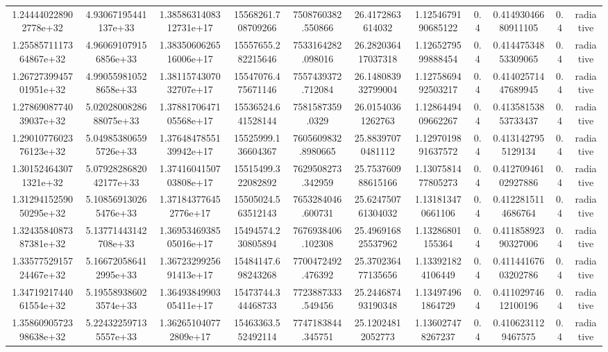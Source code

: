 \begin{table}
\begin{tabular}{ccccccccccc}
1.244440228902778e+32 & 4.93067195441137e+33 & 1.3858631408312731e+17 & 15568261.708709266 & 7508760382.550866 & 26.4172863614032 & 1.1254679190685122 & 0.4 & 0.41493046680911105 & 0.4 & radiative \\
1.2558571117364867e+32 & 4.960691079156856e+33 & 1.3835060626516006e+17 & 15557655.282215646 & 7533164282.098016 & 26.282036417037318 & 1.1265279599888454 & 0.4 & 0.41447534853309065 & 0.4 & radiative \\
1.2672739945701951e+32 & 4.990559810528658e+33 & 1.3811574307032707e+17 & 15547076.475671146 & 7557439372.712084 & 26.148083932799004 & 1.1275869492503217 & 0.4 & 0.41402571447689945 & 0.4 & radiative \\
1.2786908774039037e+32 & 5.0202800828688075e+33 & 1.3788170647105568e+17 & 15536524.641528144 & 7581587359.0329 & 26.01540361262763 & 1.1286449409662267 & 0.4 & 0.41358153853733437 & 0.4 & radiative \\
1.2901077602376123e+32 & 5.049853806595726e+33 & 1.3764847855139942e+17 & 15525999.136604367 & 7605609832.8980665 & 25.88397070481112 & 1.1297019891637572 & 0.4 & 0.4131427955129134 & 0.4 & radiative \\
1.301524643071321e+32 & 5.0792828682042177e+33 & 1.3741604150703808e+17 & 15515499.322082892 & 7629508273.342959 & 25.753760988615166 & 1.1307581477805273 & 0.4 & 0.41270946102927886 & 0.4 & radiative \\
1.3129415259050295e+32 & 5.108569130265476e+33 & 1.371843776452776e+17 & 15505024.563512143 & 7653284046.600731 & 25.624750761304032 & 1.131813470661106 & 0.4 & 0.4122815114686764 & 0.4 & radiative \\
1.3243584087387381e+32 & 5.13771443142708e+33 & 1.3695346938505016e+17 & 15494574.230805894 & 7676938406.102308 & 25.496916825537962 & 1.13286801155364 & 0.4 & 0.41185892390327006 & 0.4 & radiative \\
1.3357752915724467e+32 & 5.166720586412995e+33 & 1.3672329925691413e+17 & 15484147.698243268 & 7700472492.476392 & 25.370236477135656 & 1.133921824106449 & 0.4 & 0.41144167603202786 & 0.4 & radiative \\
1.3471921744061554e+32 & 5.195589386023574e+33 & 1.3649384990305411e+17 & 15473744.344468733 & 7723887333.549456 & 25.244687493190348 & 1.134974961864729 & 0.4 & 0.41102974612100196 & 0.4 & radiative \\
1.3586090572398638e+32 & 5.224322597135557e+33 & 1.362651040772809e+17 & 15463363.552492114 & 7747183844.345751 & 25.12024812052773 & 1.136027478267237 & 0.4 & 0.4106231129467575 & 0.4 & radiative \\

\end{tabular}
\end{table}
